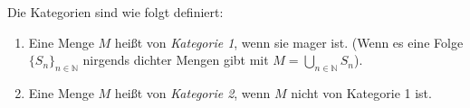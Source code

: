 \begin{rem} Die Kategorien sind wie folgt definiert: 
	\begin{enumerate} 
		\item Eine Menge $M$ heißt von \textit{Kategorie 1}, wenn sie mager ist. (Wenn es eine Folge $\{S_n\}_{n \in \mathbb{N}}$ nirgends dichter Mengen gibt mit $M = \bigcup_{n \in \mathbb{N}} S_n$).
		\item Eine Menge $M$ heißt von \textit{Kategorie 2}, wenn $M$ nicht von Kategorie 1 ist.
	\end{enumerate}
\end{rem}


	

